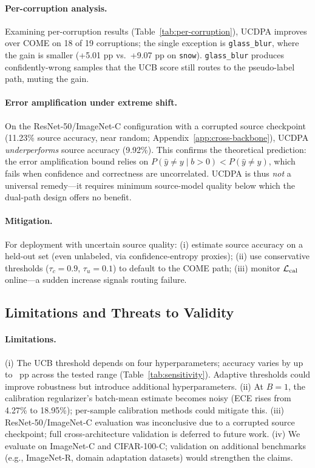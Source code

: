 \paragraph{Per-corruption analysis.}
Examining per-corruption results (Table~\ref{tab:per-corruption}), UCDPA improves over COME on 18 of 19 corruptions; the single exception is \texttt{glass\_blur}, where the gain is smaller (+5.01 pp vs.\ +9.07 pp on \texttt{snow}). \texttt{glass\_blur} produces confidently-wrong samples that the UCB score still routes to the pseudo-label path, muting the gain.

\paragraph{Error amplification under extreme shift.}
On the ResNet-50/ImageNet-C configuration with a corrupted source checkpoint (11.23\% source accuracy, near random; Appendix~\ref{app:cross-backbone}), UCDPA \emph{underperforms} source accuracy (9.92\%). This confirms the theoretical prediction: the error amplification bound relies on $P(\hat{y}\neq y \mid b>0) < P(\hat{y}\neq y)$, which fails when confidence and correctness are uncorrelated. UCDPA is thus \emph{not} a universal remedy---it requires minimum source-model quality below which the dual-path design offers no benefit.

\paragraph{Mitigation.}
For deployment with uncertain source quality: (i) estimate source accuracy on a held-out set (even unlabeled, via confidence-entropy proxies); (ii) use conservative thresholds ($\tau_c = 0.9$, $\tau_u = 0.1$) to default to the COME path; (iii) monitor $\mathcal{L}_\mathrm{cal}$ online---a sudden increase signals routing failure.

\subsection{Limitations and Threats to Validity}
\label{sec:disc:limitations}

\paragraph{Limitations.}
(i) The UCB threshold depends on four hyperparameters; accuracy varies by up to \sensRange{}~pp across the tested range (Table~\ref{tab:sensitivity}). Adaptive thresholds could improve robustness but introduce additional hyperparameters. (ii) At $B=1$, the calibration regularizer's batch-mean estimate becomes noisy (ECE rises from 4.27\% to 18.95\%); per-sample calibration methods could mitigate this. (iii) ResNet-50/ImageNet-C evaluation was inconclusive due to a corrupted source checkpoint; full cross-architecture validation is deferred to future work. (iv) We evaluate on ImageNet-C and CIFAR-100-C; validation on additional benchmarks (e.g., ImageNet-R, domain adaptation datasets) would strengthen the claims.


